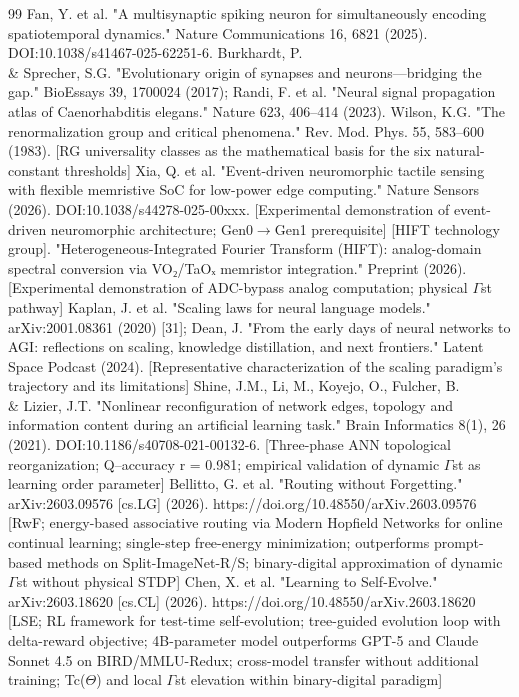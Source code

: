 \documentclass[a4paper,12pt]{article}
\begin{document}
\begin{thebibliography}{99}
 Fan, Y. et al. "A multisynaptic spiking neuron for simultaneously encoding spatiotemporal dynamics." Nature Communications 16, 6821 (2025). DOI:10.1038/s41467-025-62251-6.
 Burkhardt, P. \\& Sprecher, S.G. "Evolutionary origin of synapses and neurons---bridging the gap." BioEssays 39, 1700024 (2017); Randi, F. et al. "Neural signal propagation atlas of Caenorhabditis elegans." Nature 623, 406--414 (2023).
 Wilson, K.G. "The renormalization group and critical phenomena." Rev. Mod. Phys. 55, 583--600 (1983). [RG universality classes as the mathematical basis for the six natural-constant thresholds]
 Xia, Q. et al. "Event-driven neuromorphic tactile sensing with flexible memristive SoC for low-power edge computing." Nature Sensors (2026). DOI:10.1038/s44278-025-00xxx. [Experimental demonstration of event-driven neuromorphic architecture; Gen0$\rightarrow$Gen1 prerequisite]
 [HIFT technology group]. "Heterogeneous-Integrated Fourier Transform (HIFT): analog-domain spectral conversion via VO₂/TaOₓ memristor integration." Preprint (2026). [Experimental demonstration of ADC-bypass analog computation; physical $\Gamma$st pathway]
 Kaplan, J. et al. "Scaling laws for neural language models." arXiv:2001.08361 (2020) [31]; Dean, J. "From the early days of neural networks to AGI: reflections on scaling, knowledge distillation, and next frontiers." Latent Space Podcast (2024). [Representative characterization of the scaling paradigm's trajectory and its limitations]
 Shine, J.M., Li, M., Koyejo, O., Fulcher, B. \\& Lizier, J.T. "Nonlinear reconfiguration of network edges, topology and information content during an artificial learning task." Brain Informatics 8(1), 26 (2021). DOI:10.1186/s40708-021-00132-6. [Three-phase ANN topological reorganization; Q--accuracy r = 0.981; empirical validation of dynamic $\Gamma$st as learning order parameter]
 Bellitto, G. et al. "Routing without Forgetting." arXiv:2603.09576 [cs.LG] (2026). https://doi.org/10.48550/arXiv.2603.09576 [RwF; energy-based associative routing via Modern Hopfield Networks for online continual learning; single-step free-energy minimization; outperforms prompt-based methods on Split-ImageNet-R/S; binary-digital approximation of dynamic $\Gamma$st without physical STDP]
 Chen, X. et al. "Learning to Self-Evolve." arXiv:2603.18620 [cs.CL] (2026). https://doi.org/10.48550/arXiv.2603.18620 [LSE; RL framework for test-time self-evolution; tree-guided evolution loop with delta-reward objective; 4B-parameter model outperforms GPT-5 and Claude Sonnet 4.5 on BIRD/MMLU-Redux; cross-model transfer without additional training; Tc($\Theta$) and local $\Gamma$st elevation within binary-digital paradigm]

\end{thebibliography}
\end{document}
